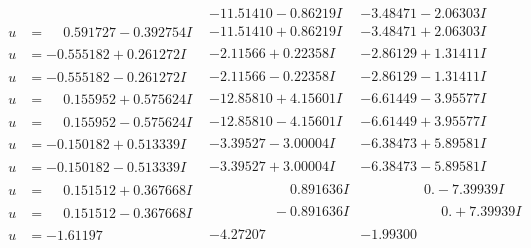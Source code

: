 \documentclass[1p]{elsarticle_modified}
\theoremstyle{definition}
\begin{document}
$$\begin{array}{c|c|c}
 & -11.51410 - 0.86219 I & -3.48471 - 2.06303 I \\ \hline\begin{aligned}
u &= \phantom{-}0.591727 - 0.392754 I\end{aligned}
 & -11.51410 + 0.86219 I & -3.48471 + 2.06303 I \\ \hline\begin{aligned}
u &= -0.555182 + 0.261272 I\end{aligned}
 & -2.11566 + 0.22358 I & -2.86129 + 1.31411 I \\ \hline\begin{aligned}
u &= -0.555182 - 0.261272 I\end{aligned}
 & -2.11566 - 0.22358 I & -2.86129 - 1.31411 I \\ \hline\begin{aligned}
u &= \phantom{-}0.155952 + 0.575624 I\end{aligned}
 & -12.85810 + 4.15601 I & -6.61449 - 3.95577 I \\ \hline\begin{aligned}
u &= \phantom{-}0.155952 - 0.575624 I\end{aligned}
 & -12.85810 - 4.15601 I & -6.61449 + 3.95577 I \\ \hline\begin{aligned}
u &= -0.150182 + 0.513339 I\end{aligned}
 & -3.39527 - 3.00004 I & -6.38473 + 5.89581 I \\ \hline\begin{aligned}
u &= -0.150182 - 0.513339 I\end{aligned}
 & -3.39527 + 3.00004 I & -6.38473 - 5.89581 I \\ \hline\begin{aligned}
u &= \phantom{-}0.151512 + 0.367668 I\end{aligned}
 & \phantom{-0.000000 -}0.891636 I & \phantom{-0.000000 } 0. - 7.39939 I \\ \hline\begin{aligned}
u &= \phantom{-}0.151512 - 0.367668 I\end{aligned}
 & \phantom{-0.000000 } -0.891636 I & \phantom{-0.000000 -}0. + 7.39939 I \\ \hline\begin{aligned}
u &= -1.61197\phantom{ +0.000000I}\end{aligned}
 & -4.27207\phantom{ +0.000000I} & -1.99300\phantom{ +0.000000I} \\ \hline\begin{aligned}

\end{aligned}
\end{array}$$
\end{document}
